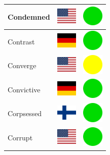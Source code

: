 \documentclass[12pt, a4paper, twoside]{report}
\begin{document}
\begin{center}
\begin{longtable}{|p{5cm}|p{2cm}|p{2cm}|}
 Condemned                                                  & \includegraphics[width=1cm]{../img/flags/us} &   \includegraphics[width=1cm]{../likes/y} \\ \hline
 Contrast                                                   & \includegraphics[width=1cm]{../img/flags/de} &   \includegraphics[width=1cm]{../likes/y} \\ \hline
 Converge                                                   & \includegraphics[width=1cm]{../img/flags/us} &   \includegraphics[width=1cm]{../likes/m} \\ \hline
 Convictive                                                 & \includegraphics[width=1cm]{../img/flags/de} &   \includegraphics[width=1cm]{../likes/y} \\ \hline
 Corpsessed                                                 & \includegraphics[width=1cm]{../img/flags/fi} &   \includegraphics[width=1cm]{../likes/y} \\ \hline
 Corrupt                                                    & \includegraphics[width=1cm]{../img/flags/us} &   \includegraphics[width=1cm]{../likes/y} \\ \hline

\end{longtable}
\end{center}
\end{document}
